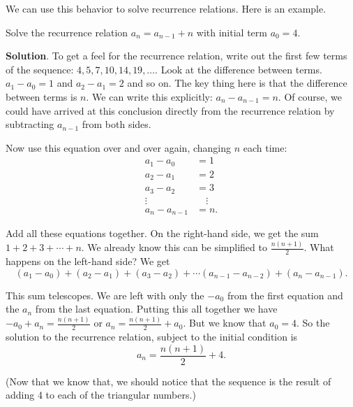 \documentclass[11pt,]{book}
\theoremstyle{ptxplainnotitle}
\theoremstyle{ptxplaintitle}
\theoremstyle{ptxdefinitionnotitle}
\theoremstyle{ptxdefinitiontitle}
\theoremstyle{ptxdefinitionnotitle}
\theoremstyle{ptxdefinitiontitle}
\theoremstyle{ptxdefinitionnotitle}
\theoremstyle{ptxdefinitiontitle}
\theoremstyle{ptxdefinitiontitlenonumber}
\theoremstyle{ptxdefinitiontitlenonumber}
\numberwithin{equation}{chapter}
\newcommand{\amp}{&}
\begin{document}
We can use this behavior to solve recurrence relations. Here is an example.%
\begin{example}\label{example-20}
\hypertarget{p-450}{}%
Solve the recurrence relation \(a_n = a_{n-1} + n\) with initial term \(a_0 = 4\).%
\par\smallskip%
\noindent\textbf{Solution}.\hypertarget{solution-61}{}\quad%
\hypertarget{p-451}{}%
To get a feel for the recurrence relation, write out the first few terms of the sequence: \(4, 5, 7, 10, 14, 19, \ldots\). Look at the difference between terms. \(a_1 - a_0 = 1\) and \(a_2 - a_1 = 2\) and so on. The key thing here is that the difference between terms is \(n\). We can write this explicitly: \(a_n - a_{n-1} = n\). Of course, we could have arrived at this conclusion directly from the recurrence relation by subtracting \(a_{n-1}\) from both sides.%
\par
\hypertarget{p-452}{}%
Now use this equation over and over again, changing \(n\) each time:%
\begin{align*}
a_1 - a_0 \amp = 1\\
a_2 - a_1 \amp = 2\\
a_3 - a_2 \amp = 3\\
\vdots \quad \amp \quad \vdots\\
a_n - a_{n-1} \amp = n.
\end{align*}
%
\par
\hypertarget{p-453}{}%
Add all these equations together. On the right-hand side, we get the sum \(1 + 2 + 3 + \cdots + n\). We already know this can be simplified to \(\frac{n(n+1)}{2}\). What happens on the left-hand side? We get%
\begin{equation*}
(a_1 - a_0) + (a_2 - a_1) + (a_3 - a_2) + \cdots (a_{n-1} - a_{n-2})+ (a_n - a_{n-1}).
\end{equation*}
%
\par
\hypertarget{p-454}{}%
This sum telescopes. We are left with only the \(-a_0\) from the first equation and the \(a_n\) from the last equation. Putting this all together we have \(-a_0 + a_n = \frac{n(n+1)}{2}\) or \(a_n = \frac{n(n+1)}{2} + a_0\). But we know that \(a_0 = 4\). So the solution to the recurrence relation, subject to the initial condition is%
\begin{equation*}
a_n = \frac{n(n+1)}{2} + 4.
\end{equation*}
%
\par
\hypertarget{p-455}{}%
(Now that we know that, we should notice that the sequence is the result of adding 4 to each of the triangular numbers.)%
\end{example}
\end{document}
